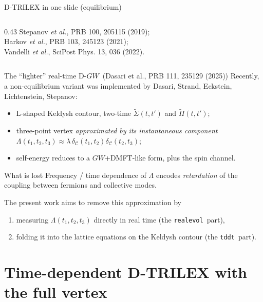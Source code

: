 \documentclass[10pt,aspectratio=169]{beamer}
\newcommand{\dgw}{D\nobreakdash-$GW$}
\newcommand{\realevol}{\texttt{realevol}}
\newcommand{\tddt}{\texttt{tddt}}
\begin{document}
\begin{frame}{D-TRILEX in one slide (equilibrium)}
\begin{columns}[T,onlytextwidth]
\begin{column}{0.43\textwidth}
      \vspace{0.8em}
      \footnotesize
      Stepanov \emph{et al.}, PRB 100, 205115 (2019);\\
      Harkov \emph{et al.}, PRB 103, 245123 (2021);\\
      Vandelli \emph{et al.}, SciPost Phys. 13, 036 (2022).
    \end{column}
  \end{columns}
\end{frame}

\begin{frame}{The ``lighter'' real-time \dgw\ (Dasari et al., PRB 111, 235129 (2025))}
  \small
  Recently, a non-equilibrium variant was implemented by Dasari, Strand,
  Eckstein, Lichtenstein, Stepanov:
  \begin{itemize}
    \item L-shaped Keldysh contour, two-time
          $\tilde\Sigma(t,t')$ and $\tilde\Pi(t,t')$;
    \item three-point vertex \emph{approximated by its
          instantaneous component}
          $\Lambda(t_1,t_2,t_3)\approx
           \lambda\,\delta_\mathcal{C}(t_1,t_2)\delta_\mathcal{C}(t_2,t_3)$;
    \item self-energy reduces to a $GW$+DMFT-like form, plus the
          spin channel.
  \end{itemize}

  \begin{alertblock}{What is lost}
    Frequency / time dependence of $\Lambda$ encodes \emph{retardation}
    of the coupling between fermions and collective modes.
  \end{alertblock}

  The present work aims to remove this approximation by
  \begin{enumerate}
    \item measuring $\Lambda(t_1,t_2,t_3)$ directly in real time
          (the \realevol\ part),
    \item folding it into the lattice equations on the Keldysh contour
          (the \tddt\ part).
  \end{enumerate}
\end{frame}

\section{Time-dependent D-TRILEX with the full vertex}
\end{document}
